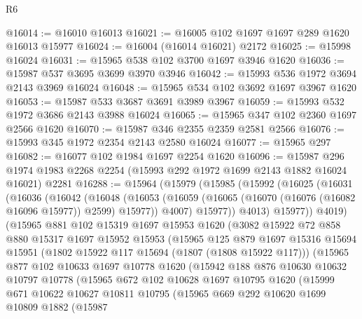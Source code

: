 \begin{lexlean}{R6}
\begin{coremodule}
@16014 := @16010 @16013
@16021 := @16005 @102 @1697 @1697 @289 @1620 @16013 @15977
@16024 := @16004 (@16014 @16021) @2172
@16025 := @15998 @16024
@16031 := @15965 @538 @102 @3700 @1697 @3946 @1620
@16036 := @15987 @537 @3695 @3699 @3970 @3946
@16042 := @15993 @536 @1972 @3694 @2143 @3969 @16024
@16048 := @15965 @534 @102 @3692 @1697 @3967 @1620
@16053 := @15987 @533 @3687 @3691 @3989 @3967
@16059 := @15993 @532 @1972 @3686 @2143 @3988 @16024
@16065 := @15965 @347 @102 @2360 @1697 @2566 @1620
@16070 := @15987 @346 @2355 @2359 @2581 @2566
@16076 := @15993 @345 @1972 @2354 @2143 @2580 @16024
@16077 := @15965 @297
@16082 := @16077 @102 @1984 @1697 @2254 @1620
@16096 := @15987
    @296
    @1974
    @1983
    @2268
    @2254
    (@15993 @292 @1972 @1699 @2143 @1882 @16024 @16021)
    @2281
@16288 := @15964
    (@15979
      (@15985
        (@15992
          (@16025
            (@16031
              (@16036
                (@16042
                  (@16048
                    (@16053
                      (@16059 (@16065 (@16070 (@16076 (@16082 @16096 @15977)) @2599) @15977))
                      @4007)
                    @15977))
                @4013)
              @15977))
          @4019)
        (@15965
          @881
          @102
          @15319
          @1697
          @15953
          @1620
          (@3082
            @15922
            @72
            @858
            @880
            @15317
            @1697
            @15952
            @15953
            (@15965
              @125
              @879
              @1697
              @15316
              @15694
              @15951
              (@1802 @15922 @117 @15694 (@1807 (@1808 @15922 @117)))
              (@15965
                @877
                @102
                @10633
                @1697
                @10778
                @1620
                (@15942
                  @188
                  @876
                  @10630
                  @10632
                  @10797
                  @10778
                  (@15965
                    @672
                    @102
                    @10628
                    @1697
                    @10795
                    @1620
                    (@15999
                      @671
                      @10622
                      @10627
                      @10811
                      @10795
                      (@15965
                        @669
                        @292
                        @10620
                        @1699
                        @10809
                        @1882
                        (@15987

\end{coremodule}
\end{lexlean}
